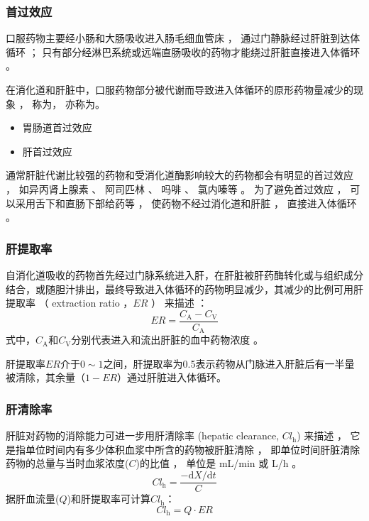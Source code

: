\documentclass[dvipsnames, svgnames, x11names]{beamer}
\begin{document}
\begin{frame}
    \frametitle{首过效应}
    口服药物主要经小肠和大肠吸收进入肠毛细血管床 ， 通过门静脉经过肝脏到达体循环 ； 只有部分经淋巴系统或远端直肠吸收的药物才能绕过肝脏直接进入体循环 。 

    在消化道和肝脏中，口服药物部分被代谢而导致进入体循环的原形药物量减少的现象 ， 称为， 亦称为。
    \begin{itemize}
      \item 胃肠道首过效应
      \item 肝首过效应
    \end{itemize}
    \begin{blankblock}{}
      通常肝脏代谢比较强的药物和受消化道酶影响较大的药物都会有明显的首过效应 ， 如异丙肾上腺素 、 阿司匹林 、 吗啡 、 氯内嗪等 。 为了避免首过效应 ， 可以采用舌下和直肠下部给药等 ， 使药物不经过消化道和肝脏 ， 直接进入体循环 。
    \end{blankblock}
\end{frame}


\begin{frame}
    \frametitle{肝提取率}
    自消化道吸收的药物首先经过门脉系统进入肝，在肝脏被肝药酶转化或与组织成分结合，或随胆汁排出，最终导致进入体循环的药物明显减少，其减少的比例可用肝提取率 （ extraction ratio ，$ER$ ） 来描述 ：
    \[
        ER=\frac{C_{\mathrm{A}}-C_{\mathrm{V}}}{C_{\mathrm{A}}}
    \]
    式中，$C_{\mathrm{A}}$和$C_{\mathrm{V}}$分别代表进入和流出肝脏的血中药物浓度 。

    肝提取率$ER$介于$0\sim 1$之间，肝提取率为0.5表示药物从门脉进入肝脏后有一半量被清除，其余量（$1-ER$）通过肝脏进入体循环。

\end{frame}

\begin{frame}
    \frametitle{肝清除率}
    肝脏对药物的消除能力可进一步用肝清除率 (hepatic clearance, $Cl_{\mathrm{h}}$) 来描述 ， 它是指单位时间内有多少体积血浆中所含的药物被肝脏清除 ， 即单位时间肝脏清除药物的总量与当时血浆浓度($C$)的比值 ， 单位是 mL/min 或 L/h 。
    \[
      Cl_{\mathrm{h}}=\frac{-\mathrm{d}X/\mathrm{d}t}C
    \]
    据肝血流量($Q$)和肝提取率可计算$Cl_{\mathrm{h}}$：
    \[
      Cl_{\mathrm{h}}=Q\cdot ER
    \]
\end{frame}
\end{document}

